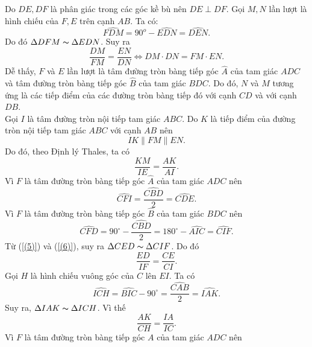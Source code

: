 \begin{bt}
{\begin{center}
		\end{center}
		Do $DE, DF$ là phân giác trong các góc kề bù nên $DE\perp DF$.
		Gọi $M, N$ lần lượt là hình chiếu của $F, E$ trên cạnh $AB$. Ta có:
		$$\widehat{FDM}=90^o-\widehat{EDN}=\widehat{DEN}.$$
		Do đó $\Delta DFM \thicksim \Delta EDN$. Suy ra
		\begin{equation}\label{(3)}
		\dfrac{DM}{FM}=\dfrac{EN}{DN}\Leftrightarrow
		DM\cdot DN=FM\cdot EN.
		\end{equation}
		Dễ thấy, $F$ và $E$ lần lượt là tâm đường tròn bàng tiếp góc $\widehat{A}$ của tam giác $ADC$ và tâm đường tròn bàng tiếp góc $\widehat{B}$ của tam giác $BDC$. Do đó, $N$ và $M$ tương ứng là các tiếp điểm của các đường tròn bàng tiếp đó với cạnh $CD$ và với cạnh $DB$.\\
		Gọi $I$ là tâm đường tròn nội tiếp tam giác $ABC$. Do $K$ là tiếp điểm của đường tròn nội tiếp tam giác $ABC$ với cạnh $AB$ nên
		$$IK\parallel FM\parallel EN.$$
		Do đó, theo Định lý Thales, ta có
		\begin{equation}\label{(4)}
		\dfrac{KM}{IE}=\dfrac{AK}{AI}.
		\end{equation}
		Vì $F$ là tâm đường tròn bàng tiếp góc $\widehat{A}$ của tam giác $ADC$ nên
		\begin{equation}\label{(5)}
		\widehat{CFI}=\dfrac{\widehat{CBD}}{2}=\widehat{CDE}.
		\end{equation}
		Vì $F$ là tâm đường tròn bàng tiếp góc $\widehat{B}$ của tam giác $BDC$ nên
		\begin{equation}\label{(6)}
		\widehat{CFD}=90^\circ-\dfrac{\widehat{CBD}}{2}=180^\circ-\widehat{AIC}=\widehat{CIF}.
		\end{equation}
		Từ (\ref{(5)}) và (\ref{(6)}), suy ra $\Delta CED\thicksim \Delta CIF$. Do đó
		\begin{equation}\label{(7)}
		\dfrac{ED}{IF}=\dfrac{CE}{CI}.
		\end{equation}
		Gọi $H$ là hình chiếu vuông góc của $C$ lên $EI$. Ta có
		$$\widehat{ICH}=\widehat{BIC}-90^\circ=\dfrac{\widehat{CAB}}{2}=\widehat{IAK}.$$
		Suy ra, $\Delta IAK\thicksim\Delta ICH$. Vì thế
		\begin{equation}\label{(8)}
		\dfrac{AK}{CH}=\dfrac{IA}{IC}.
		\end{equation}
		Vì $F$ là tâm đường tròn bàng tiếp góc $A$ của tam giác $ADC$ nên
}
\end{bt}
